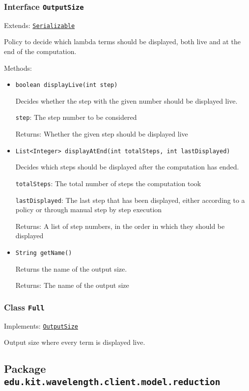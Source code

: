 \subsubsection{Interface \texttt{OutputSize}}
\label{type:edu.kit.wavelength.client.model.output.OutputSize}
Extends: \texttt{\hyperref[type:edu.kit.wavelength.client.model.serialization.Serializable]{Serializable}}

Policy to decide which lambda terms should be displayed,
 both live and at the end of the computation.

Methods:
\begin{itemize}
\item \texttt{boolean displayLive(int step)}

Decides whether the step with the given number should be displayed live.

\texttt{step}: The step number to be considered

Returns: Whether the given step should be displayed live

\item \texttt{List<Integer> displayAtEnd(int totalSteps, int lastDisplayed)}

Decides which steps should be displayed after the computation has ended.

\texttt{totalSteps}: The total number of steps the computation took

\texttt{lastDisplayed}: The last step that has been displayed, either
 according to a policy or through manual step by step execution

Returns: A list of step numbers, in the order in which they should be displayed

\item \texttt{String getName()}

Returns the name of the output size.

Returns: The name of the output size

\end{itemize}

\subsubsection{Class \texttt{Full}}
\label{type:edu.kit.wavelength.client.model.output.Full}
Implements: \texttt{\hyperref[type:edu.kit.wavelength.client.model.output.OutputSize]{OutputSize}}

Output size where every term is displayed live.

\subsection{Package \lstinline{edu.kit.wavelength.client.model.reduction}}
\label{pkg:edu.kit.wavelength.client.model.reduction}


